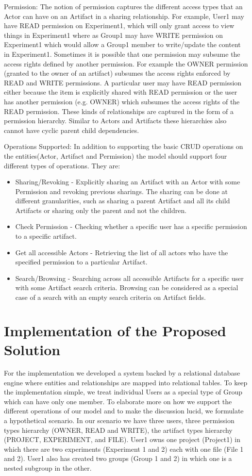 \documentclass[sigconf]{acmart}
\begin{document}
Permission: The notion of permission captures the different access types that an Actor can have on an Artifact in a sharing relationship. For example, User1 may have READ permission on Experiment1, which will only grant access to view things in Experiment1 where as Group1 may have WRITE permission on Experiment1 which would allow a Group1 member to write/update the content in Experiment1. Sometimes it is possible that one permission may subsume the access rights defined by another permission. For example the OWNER permission (granted to the owner of an artifact) subsumes the access rights enforced by READ and WRITE permissions. A particular user may have READ permission either because the item is explicitly shared with READ permission or the user has another permission (e.g. OWNER) which subsumes the access rights of the READ permission. These kinds of relationships are captured in the form of a permission hierarchy. Similar to Actors and Artifacts these hierarchies also cannot have cyclic parent child dependencies.

Operations Supported: In addition to supporting the basic CRUD operations on the entities(Actor, Artifact and Permission) the model should support four different types of operations. They are:
\begin{itemize}
\item
Sharing/Revoking - Explicitly sharing an Artifact with an Actor with some Permission and revoking previous sharings. The sharing can be done at different granularities, such as sharing a parent Artifact and all its child Artifacts or sharing only the parent and not the children.
\item
Check Permission - Checking whether a specific user has a specific permission to a specific artifact.
\item
Get all accessible Actors - Retrieving the list of all actors who have the specified permission to a particular Artifact. 
\item
Search/Browsing - Searching across all accessible Artifacts for a specific user with some Artifact search criteria. Browsing can be considered as a special case of a search with an empty search criteria on Artifact fields.
\end{itemize}


\section{Implementation of the Proposed Solution}
For the implementation we developed a system backed by a relational database engine where entities and relationships are mapped into relational tables. To keep the implementation simple, we treat individual Users as a special type of Group which can have only one member. To elaborate more on how we support the different operations of our model and to make the discussion lucid, we formulate a hypothetical scenario. In our scenario we have three users, three permission types hierarchy (OWNER, READ and WRITE), the artifact types hierarchy (PROJECT, EXPERIMENT, and FILE). User1 owns one project (Project1) in which there are two experiments (Experiment 1 and 2) each with one file (File 1 and 2). User1 also has created two groups (Group 1 and 2) in which one is a nested subgroup in the other.
\end{document}
